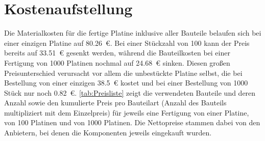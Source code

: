 \section{Kostenaufstellung}
Die Materialkosten für die fertige Platine inklusive aller Bauteile belaufen sich bei einer einzigen Platine auf \SI{80,26}{\euro}. Bei einer Stückzahl von 100 kann der Preis bereits auf \SI{33,51}{\euro} gesenkt werden, während die Bauteilkosten bei einer Fertigung von 1000 Platinen nochmal auf \SI{24,68}{\euro} sinken. Diesen großen Preisunterschied verursacht vor allem die unbestückte Platine selbst, die bei Bestellung von einer einzigen \SI{38,5}{\euro} kostet und bei einer Bestellung von 1000 Stück nur noch \SI{0,82}{\euro}. \autoref{tab:Preisliste} zeigt die verwendeten Bauteile und deren Anzahl sowie den kumulierte Preis pro Bauteilart (Anzahl des Bauteils multipliziert mit dem Einzelpreis) für jeweils eine Fertigung von einer Platine, von 100 Platinen und von 1000 Platinen. Die Nettopreise stammen dabei von den Anbietern, bei denen die Komponenten jeweils eingekauft wurden.
